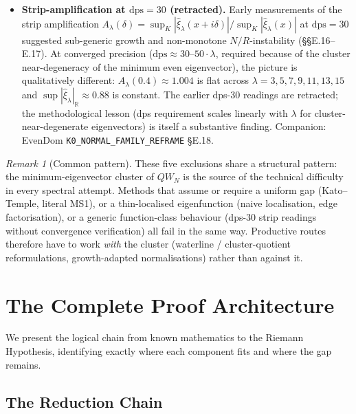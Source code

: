 \documentclass[12pt,a4paper]{article}
\theoremstyle{definition}
\theoremstyle{remark}
\newtheorem{remark}[theorem]{Remark}
\begin{document}
\begin{itemize}
  \item \textbf{Strip-amplification at $\mathrm{dps}=30$ (retracted).} Early measurements of the strip amplification $A_\lambda(\delta)=\sup_K|\hat\xi_\lambda(x+i\delta)|/\sup_K|\hat\xi_\lambda(x)|$ at $\mathrm{dps}=30$ suggested sub-generic growth and non-monotone $N/R$-instability (\S\S E.16--E.17). At converged precision ($\mathrm{dps}\approx 30\text{--}50\cdot\lambda$, required because of the cluster near-degeneracy of the minimum even eigenvector), the picture is qualitatively different: $A_\lambda(0.4)\approx 1.004$ is flat across $\lambda=3,5,7,9,11,13,15$ and $\sup|\hat\xi_\lambda|_{\mathbb R}\approx 0.88$ is constant. The earlier dps-30 readings are retracted; the methodological lesson (dps requirement scales linearly with $\lambda$ for cluster-near-degenerate eigenvectors) is itself a substantive finding. Companion: EvenDom \texttt{K0\_NORMAL\_FAMILY\_REFRAME} \S E.18.
\end{itemize}

\begin{remark}[Common pattern]
These five exclusions share a structural pattern: the minimum-eigenvector cluster of $QW_N$ is the source of the technical difficulty in every spectral attempt. Methods that assume or require a uniform gap (Kato--Temple, literal MS1), or a thin-localised eigenfunction (naive localisation, edge factorisation), or a generic function-class behaviour (dps-30 strip readings without convergence verification) all fail in the same way. Productive routes therefore have to work \emph{with} the cluster (waterline / cluster-quotient reformulations, growth-adapted normalisations) rather than against it.
\end{remark}


\section{The Complete Proof Architecture}
\label{sec:architecture}

We present the logical chain from known mathematics to the Riemann Hypothesis, identifying exactly where each component fits and where the gap remains.

\subsection{The Reduction Chain}
\end{document}

